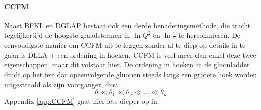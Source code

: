 \documentclass[a4paper,11pt]{article}
\numberwithin{equation}{section} %
\begin{document}
      \paragraph{CCFM}
Naast BFKL en DGLAP bestaat ook een derde benaderingsmethode, die tracht tegelijkertijd de hoogste graadstermen in $\ln{Q^2}$ en $\ln{\frac{1}{x}}$ te hersommeren.
De eenvoudigste manier om CCFM uit te leggen zonder al te diep op details in te gaan is DLLA + een ordening in hoeken.
CCFM is veel meer dan enkel deze twee eigenschappen, maar dit volstaat hier.
De ordening in hoeken in de gluonladder duidt op het feit dat opeenvolgende gluonen steeds langs een grotere hoek worden uitgestraald als zijn voorganger, dus:
\begin{equation} \label{eq:HoekOrdening}
\theta \ll \theta_1 \ll \theta_2 \ll \hdots \ll \theta_n
\end{equation}
Appendix \ref{app:CCFM} gaat hier iets dieper op in.
\end{document}
